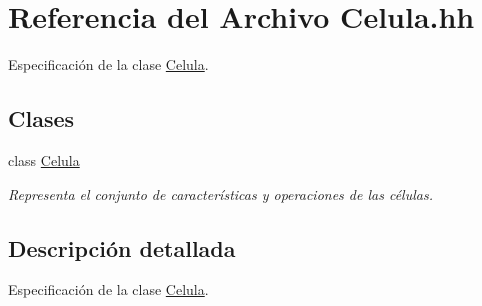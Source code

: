 \hypertarget{_celula_8hh}{}\section{Referencia del Archivo Celula.\+hh}
\label{_celula_8hh}


Especificación de la clase \hyperlink{class_celula}{Celula}.  


\subsection*{Clases}
\begin{DoxyCompactItemize}
\item 
class \hyperlink{class_celula}{Celula}
\begin{DoxyCompactList}\small\item\em Representa el conjunto de características y operaciones de las células. \end{DoxyCompactList}\end{DoxyCompactItemize}


\subsection{Descripción detallada}
Especificación de la clase \hyperlink{class_celula}{Celula}. 

